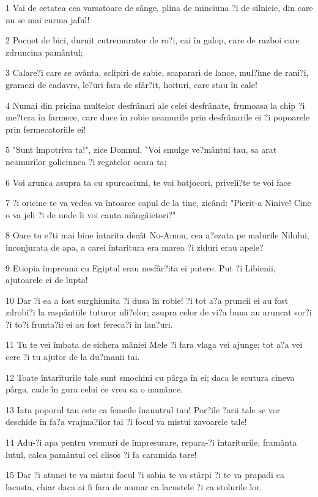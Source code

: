 \par 1 Vai de cetatea cea varsatoare de sânge, plina de minciuna ?i de silnicie, din care nu se mai curma jaful!
\par 2 Pocnet de bici, duruit cutremurator de ro?i, cai în galop, care de razboi care zdruncina pamântul;
\par 3 Calare?i care se avânta, sclipiri de sabie, scaparari de lance, mul?ime de rani?i, gramezi de cadavre, le?uri fara de sfâr?it, hoituri, care stau în cale!
\par 4 Numai din pricina multelor desfrânari ale celei desfrânate, frumoasa la chip ?i me?tera în farmece, care duce în robie neamurile prin desfrânarile ei ?i popoarele prin fermecatoriile ei!
\par 5 "Sunt împotriva ta!", zice Domnul. "Voi smulge ve?mântul tau, sa arat neamurilor goliciunea ?i regatelor ocara ta;
\par 6 Voi arunca asupra ta cu spurcaciuni, te voi batjocori, priveli?te te voi face
\par 7 ?i oricine te va vedea va întoarce capul de la tine, zicând: "Pierit-a Ninive! Cine o va jeli ?i de unde îi voi cauta mângâietori?"
\par 8 Oare tu e?ti mai bine întarita decât No-Amon, cea a?ezata pe malurile Nilului, înconjurata de apa, a carei întaritura era marea ?i ziduri erau apele?
\par 9 Etiopia împreuna cu Egiptul erau nesfâr?ita ei putere. Put ?i Libienii, ajutoarele ei de lupta!
\par 10 Dar ?i ea a fost surghiunita ?i dusa în robie! ?i tot a?a pruncii ei au fost zdrobi?i la raspântiile tuturor uli?elor; asupra celor de vi?a buna au aruncat sor?i ?i to?i frunta?ii ei au fost fereca?i în lan?uri.
\par 11 Tu te vei îmbata de sichera mâniei Mele ?i fara vlaga vei ajunge; tot a?a vei cere ?i tu ajutor de la du?manii tai.
\par 12 Toate întariturile tale sunt smochini cu pârga în ei; daca le scutura cineva pârga, cade în gura celui ce vrea sa o manânce.
\par 13 Iata poporul tau este ca femeile înauntrul tau! Por?ile ?arii tale se vor deschide în fa?a vrajma?ilor tai ?i focul va mistui zavoarele tale!
\par 14 Adu-?i apa pentru vremuri de împresurare, repara-?i întariturile, framânta lutul, calca pamântul cel clisos ?i fa caramida tare!
\par 15 Dar ?i atunci te va mistui focul ?i sabia te va stârpi ?i te va prapadi ca lacusta, chiar daca ai fi fara de numar ca lacustele ?i ca stolurile lor.
